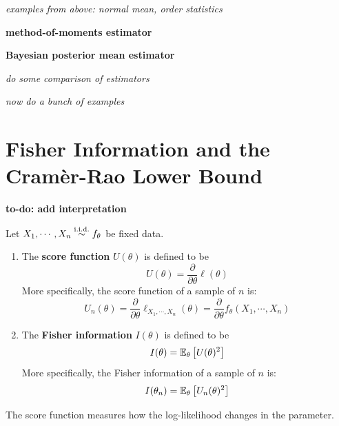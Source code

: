 \documentclass[../../../main.tex]{subfiles}
\begin{document}
\textit{examples from above: normal mean, order statistics}

\begin{definition}
    \textbf{method-of-moments estimator}
\end{definition}

\begin{definition}
    \textbf{Bayesian posterior mean estimator}
\end{definition}

\textit{do some comparison of estimators}

\textit{now do a bunch of examples}

\section{Fisher Information and the Cramèr-Rao Lower Bound}

\textbf{to-do: add interpretation}

\begin{definition}
    Let $X_1,\cdots, X_n\overset{\mathrm{i.i.d.}}{\sim} f_\theta$ be fixed data.
    \begin{enumerate}
        \item The \textbf{score function} $U(\theta)$ is defined to be
        \begin{equation*}
            U(\theta)=\frac{\partial}{\partial \theta} \ell(\theta)
        \end{equation*}
        More specifically, the score function of a sample of $n$ is:
        \begin{equation*}
            U_n(\theta)=\frac{\partial}{\partial \theta} \ell_{X_1,\cdots,X_n}(\theta)= \frac{\partial}{\partial \theta} f_\theta(X_1,\cdots,X_n)
        \end{equation*}
        \item The \textbf{Fisher information} $I(\theta)$ is defined to be
        \begin{equation*}
            I(\theta)=\mathbb{E}_\theta\left[U(\theta)^2\right]
        \end{equation*}
        More specifically, the Fisher information of a sample of $n$ is:
            \begin{equation*}
            I(\theta_n)=\mathbb{E}_\theta\left[U_n(\theta)^2\right]
        \end{equation*}
    \end{enumerate}
\end{definition}

The score function measures how the log-likelihood changes in the parameter. 
\end{document}
